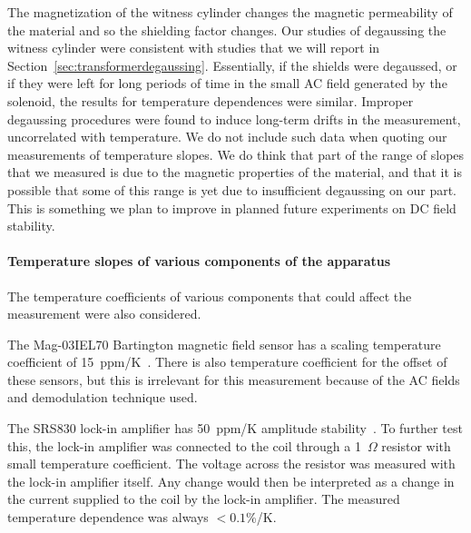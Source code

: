 



The magnetization of the witness cylinder changes the magnetic
permeability of the material and so the shielding factor changes.  Our
studies of degaussing the witness cylinder were consistent with
studies that we will report in
Section~\ref{sec:transformerdegaussing}.  Essentially, if the shields
were degaussed, or if they were left for long periods of time in the
small AC field generated by the solenoid, the results for temperature
dependences were similar.  Improper degaussing procedures were found
to induce long-term drifts in the measurement, uncorrelated with
temperature.  We do not include such data when quoting our
measurements of temperature slopes.  We do think that part of the
range of slopes that we measured is due to the magnetic properties of
the material, and that it is possible that some of this range is yet
due to insufficient degaussing on our part.  This is something we plan
to improve in planned future experiments on DC field stability.



\paragraph{Temperature slopes of various components of the apparatus}

The temperature coefficients of various components that could affect
the measurement were also considered.

The Mag-03IEL70 Bartington magnetic field sensor has a scaling
temperature coefficient of 15~ppm/K~\cite{bib:bartman}.  There is also
temperature coefficient for the offset of these sensors, but this is
irrelevant for this measurement because of the AC fields and
demodulation technique used.

The SRS830 lock-in amplifier has 50~ppm/K amplitude
stability~\cite{bib:lockin}.
To further test this, the lock-in amplifier was connected to the coil
through a 1~$\Omega$ resistor with small temperature coefficient.  The
voltage across the resistor was measured with the lock-in amplifier
itself.  Any change would then be interpreted as a change in the
current supplied to the coil by the lock-in amplifier.  The measured
temperature dependence was always $<0.1$\%/K.


